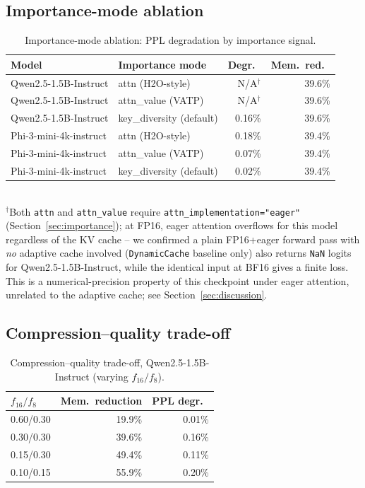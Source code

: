 \documentclass[conference]{IEEEtran}
\begin{document}
\subsection{Importance-mode ablation}
\label{sec:mode-ablation-results}
\begin{table}[t]
\centering
\caption{Importance-mode ablation: PPL degradation by importance signal.}
\label{tab:mode-ablation}
\begin{tabular}{llrr}
\toprule
Model & Importance mode & Degr.\ & Mem.\ red.\ \\
\midrule
Qwen2.5-1.5B-Instruct & attn (H2O-style) & N/A$^\dagger$ & 39.6\% \\
Qwen2.5-1.5B-Instruct & attn\_value (VATP) & N/A$^\dagger$ & 39.6\% \\
Qwen2.5-1.5B-Instruct & key\_diversity (default) & 0.16\% & 39.6\% \\
Phi-3-mini-4k-instruct & attn (H2O-style) & 0.18\% & 39.4\% \\
Phi-3-mini-4k-instruct & attn\_value (VATP) & 0.07\% & 39.4\% \\
Phi-3-mini-4k-instruct & key\_diversity (default) & 0.02\% & 39.4\% \\
\bottomrule
\end{tabular}
\\[2pt]
{\footnotesize $^\dagger$Both \texttt{attn} and \texttt{attn\_value} require
\texttt{attn\_implementation="eager"} (Section~\ref{sec:importance}); at FP16, eager
attention overflows for this model regardless of the KV cache -- we confirmed a plain
FP16+eager forward pass with \emph{no} adaptive cache involved (\texttt{DynamicCache}
baseline only) also returns \texttt{NaN} logits for Qwen2.5-1.5B-Instruct, while the
identical input at BF16 gives a finite loss. This is a numerical-precision property of
this checkpoint under eager attention, unrelated to the adaptive cache; see
Section~\ref{sec:discussion}.}
\end{table}

\subsection{Compression--quality trade-off}
\label{sec:pareto-results}
\begin{table}[t]
\centering
\caption{Compression--quality trade-off, Qwen2.5-1.5B-Instruct (varying $f_{16}/f_8$).}
\label{tab:pareto}
\begin{tabular}{lrr}
\toprule
$f_{16}/f_8$ & Mem.\ reduction & PPL degr.\ \\
\midrule
0.60/0.30 & 19.9\% & 0.01\% \\
0.30/0.30 & 39.6\% & 0.16\% \\
0.15/0.30 & 49.4\% & 0.11\% \\
0.10/0.15 & 55.9\% & 0.20\% \\
\bottomrule
\end{tabular}
\end{table}
\end{document}
